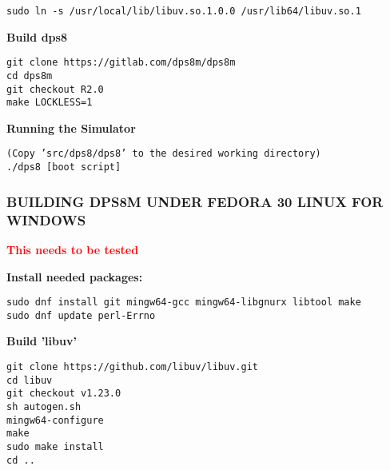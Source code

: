 \begin{adjustwidth}{5ex}{1ex}
    \texttt{sudo ln -s /usr/local/lib/libuv.so.1.0.0 /usr/lib64/libuv.so.1} \\
\end{adjustwidth}

\textbf{Build dps8}

\begin{adjustwidth}{5ex}{1ex}
    \texttt{git clone https://gitlab.com/dps8m/dps8m} \\
    \texttt{cd dps8m} \\
    \texttt{git checkout R2.0} \\
    \texttt{make LOCKLESS=1} \\
\end{adjustwidth}

\textbf{Running the Simulator}

\begin{adjustwidth}{5ex}{1ex}
    \texttt{(Copy 'src/dps8/dps8' to the desired working directory)} \\
    \texttt{./dps8 [boot script]} \\
\end{adjustwidth}

\newpage

\subsubsection[Building dps8m under Fedora 30 Linux For Windows]{BUILDING DPS8M UNDER FEDORA 30 LINUX FOR WINDOWS}

\textbf{\textcolor{red}{This needs to be tested}}

\textbf{Install needed packages:}

\begin{adjustwidth}{5ex}{1ex}
	\texttt{sudo dnf install git mingw64-gcc mingw64-libgnurx libtool make} \\
    \texttt{sudo dnf update perl-Errno} \\
\end{adjustwidth}

\textbf{Build 'libuv'}

\begin{adjustwidth}{5ex}{1ex}
    \texttt{git clone https://github.com/libuv/libuv.git} \\
    \texttt{cd libuv} \\
    \texttt{git checkout v1.23.0} \\
    \texttt{sh autogen.sh} \\
    \texttt{mingw64-configure} \\
    \texttt{make} \\
    \texttt{sudo make install} \\
    \texttt{cd ..} \\
\end{adjustwidth}

